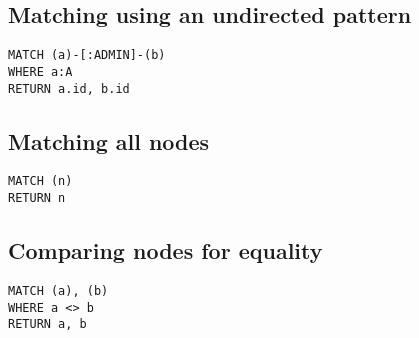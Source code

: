 \subsection{Matching using an undirected pattern}

\begin{lstlisting}
MATCH (a)-[:ADMIN]-(b)
WHERE a:A
RETURN a.id, b.id
\end{lstlisting}

\subsection{Matching all nodes}

\begin{lstlisting}
MATCH (n)
RETURN n
\end{lstlisting}

\subsection{Comparing nodes for equality}

\begin{lstlisting}
MATCH (a), (b)
WHERE a <> b
RETURN a, b
\end{lstlisting}

